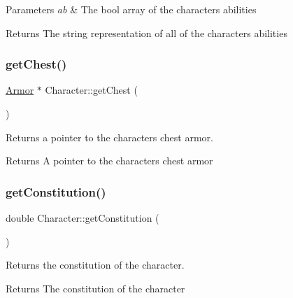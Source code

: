 \begin{DoxyParams}{Parameters}
{\em ab} & The bool array of the character\textquotesingle{}s abilities \\
\hline
\end{DoxyParams}
\begin{DoxyReturn}{Returns}
The string representation of all of the character\textquotesingle{}s abilities 
\end{DoxyReturn}
\mbox{\label{class_character_a5bdf09759593911af55ce0a9f9f7959f}} 
\subsubsection{\texorpdfstring{getChest()}{getChest()}}
{\footnotesize\ttfamily \mbox{\hyperlink{class_armor}{Armor}} $\ast$ Character\+::get\+Chest (\begin{DoxyParamCaption}{ }\end{DoxyParamCaption})}



Returns a pointer to the character\textquotesingle{}s chest armor. 

\begin{DoxyReturn}{Returns}
A pointer to the character\textquotesingle{}s chest armor 
\end{DoxyReturn}
\mbox{\label{class_character_a8220740f682216e2205a17a93da24da5}} 
\subsubsection{\texorpdfstring{getConstitution()}{getConstitution()}}
{\footnotesize\ttfamily double Character\+::get\+Constitution (\begin{DoxyParamCaption}{ }\end{DoxyParamCaption})}



Returns the constitution of the character. 

\begin{DoxyReturn}{Returns}
The constitution of the character 
\end{DoxyReturn}
\mbox{\label{class_character_a9cfa4e4ca2a08b794c3b6c463d2d57b0}} 
